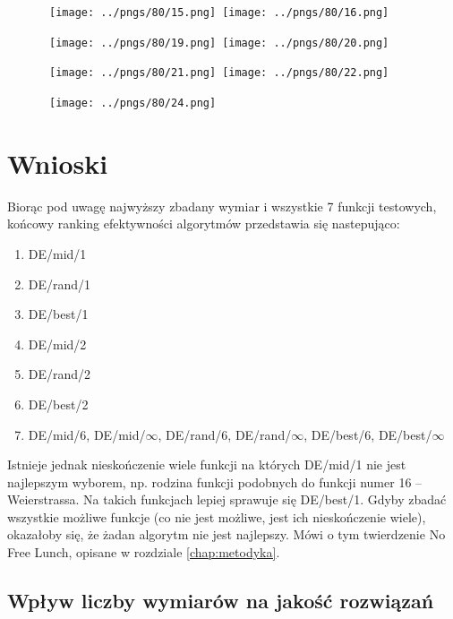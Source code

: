 \documentclass[a4paper,onecolumn,oneside,11pt,wide,floatssmall]{mwrep}
\theoremstyle{definition}
\theoremstyle{plain}%
\theoremstyle{remark}
\begin{document}
\begin{figure}[H]
\centering
\mbox{
\texttt{[image: ../pngs/80/15.png]} \quad
\texttt{[image: ../pngs/80/16.png]} 
}
\end{figure}

\begin{figure}[H]
\centering
\mbox{
\texttt{[image: ../pngs/80/19.png]} \quad
\texttt{[image: ../pngs/80/20.png]} 
}
\end{figure}

\begin{figure}[H]
\centering
\mbox{
\texttt{[image: ../pngs/80/21.png]} \quad
\texttt{[image: ../pngs/80/22.png]} 
}
\end{figure}

\begin{figure}[H]
\centering
\mbox{
\texttt{[image: ../pngs/80/24.png]} \quad
}
\end{figure}

\section{Wnioski}

Biorąc pod uwagę najwyższy zbadany wymiar i wszystkie 7 funkcji testowych,
końcowy ranking efektywności algorytmów przedstawia się 
nastepująco:

\begin{enumerate}
 \item DE/mid/1
 \item DE/rand/1
 \item DE/best/1
 \item DE/mid/2
 \item DE/rand/2
 \item DE/best/2
 \item DE/mid/6, DE/mid/$\infty$, DE/rand/6, DE/rand/$\infty$, DE/best/6, DE/best/$\infty$
\end{enumerate}

Istnieje jednak nieskończenie wiele funkcji na których DE/mid/1 nie jest najlepszym wyborem, np. rodzina
funkcji podobnych do funkcji numer 16 -- Weierstrassa. Na takich funkcjach lepiej sprawuje się 
DE/best/1. Gdyby zbadać wszystkie możliwe funkcje (co nie jest możliwe, jest ich nieskończenie wiele),
okazałoby się, że żadan algorytm nie jest
najlepszy. Mówi o tym twierdzenie No Free Lunch, opisane w rozdziale \ref{chap:metodyka}.

\subsection{Wpływ liczby wymiarów na jakość rozwiązań}
\end{document}
